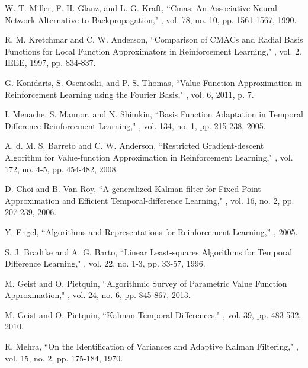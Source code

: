 \documentclass{ieeeaccess}
\begin{document}
\begin{thebibliography}{46}
 W. T. Miller, F. H. Glanz, and L. G. Kraft,
\newblock ``Cmas: An Associative Neural Network Alternative to Backpropagation,"
, vol. 78, no. 10, pp. 1561-1567, 1990.

 R. M. Kretchmar and C. W. Anderson,
\newblock ``Comparison of CMACs and Radial Basis Functions for Local Function Approximators in Reinforcement Learning,"
, vol. 2. IEEE, 1997, pp. 834-837.

 G. Konidaris, S. Osentoski, and P. S. Thomas,
``Value Function Approximation in Reinforcement Learning using the Fourier Basis,"
, vol. 6, 2011, p. 7.

 I. Menache, S. Mannor, and N. Shimkin,
\newblock ``Basis Function Adaptation in Temporal Difference Reinforcement Learning,"
, vol. 134, no. 1, pp. 215-238, 2005.

 A. d. M. S. Barreto and C. W. Anderson,
\newblock ``Restricted Gradient-descent Algorithm for Value-function Approximation in Reinforcement Learning,"
, vol. 172, no. 4-5, pp. 454-482, 2008.

D. Choi and B. Van Roy,
\newblock ``A generalized Kalman filter for Fixed Point Approximation and Efficient Temporal-difference Learning,"
, vol. 16, no. 2, pp. 207-239, 2006.

 Y. Engel,
\newblock ``Algorithms and Representations for Reinforcement Learning,''
, 2005.

 S. J. Bradtke and A. G. Barto,
 \newblock ``Linear Least-squares Algorithms for Temporal Difference Learning,"
 , vol. 22, no. 1-3, pp. 33-57, 1996.

 M. Geist and O. Pietquin,
 \newblock ``Algorithmic Survey of Parametric Value Function Approximation,"
 , vol. 24, no. 6, pp. 845-867, 2013.

M. Geist and O. Pietquin,
\newblock ``Kalman Temporal Differences,"
, vol. 39, pp. 483-532, 2010.

 R. Mehra,
 \newblock ``On the Identification of Variances and Adaptive Kalman Filtering,"
 , vol. 15, no. 2, pp. 175-184, 1970.


\end{thebibliography}
\end{document}

